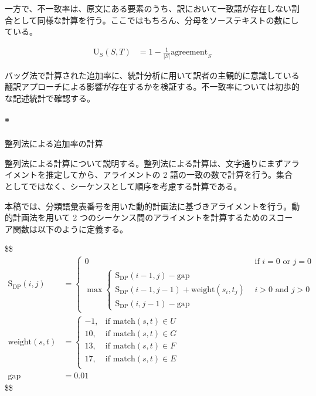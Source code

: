 \documentclass[
  letterpaper,
  DIV=11,
  numbers=noendperiod]{scrartcl}
\let\oldparagraph\paragraph
\renewcommand{\paragraph}[1]{\oldparagraph{#1}\mbox{}}
\begin{document}
一方で、不一致率は、原文にある要素のうち、訳において一致語が存在しない割合として同様な計算を行う。ここではもちろん、分母をソーステキストの数にしている。

\[
\begin{align}
\text{U}_{S}(S,T) &= 1 - \frac{1}{|S|}\text{agreement}_{S}
\end{align}
\]

バッグ法で計算された追加率に、統計分析に用いて訳者の主観的に意識している翻訳アプローチによる影響が存在するかを検証する。不一致率については初歩的な記述統計で確認する。

\paragraph*{整列法による追加率の計算}\label{ux6574ux5217ux6cd5ux306bux3088ux308bux8ffdux52a0ux7387ux306eux8a08ux7b97}

整列法による計算について説明する。整列法による計算は、文字通りにまずアライメントを推定してから、アライメントの
2
語の一致の数で計算を行う。集合としてではなく、シーケンスとして順序を考慮する計算である。

本稿では、分類語彙表番号を用いた動的計画法に基づきアライメントを行う。動的計画法を用いて
2
つのシーケンス間のアライメントを計算するためのスコーア関数は以下のように定義する。

\$\$ \begin{align}
\text{S}_{\text{DP}}(i, j) &=
\begin{cases}
0 & \text{if } i = 0 \text{ or } j = 0 \\
\max
\begin{cases}
\text{S}_{\text{DP}}(i-1, j) - \text{gap} \\
\text{S}_{\text{DP}}(i-1, j-1) + \text{weight}(s_i, t_j) \\
\text{S}_{\text{DP}}(i, j-1) - \text{gap}
\end{cases} & i > 0 \text{ and } j > 0
\end{cases}\\

\text{weight}(s,t) &=
\begin{cases}
-1, & \text{if } \text{match}(s,t) \in U \\
10, & \text{if } \text{match}(s,t) \in G \\
13, & \text{if } \text{match}(s,t) \in F \\
17, & \text{if } \text{match}(s,t) \in E \\
\end{cases}\\

\text{gap} &= 0.01
\end{align} \$\$
\end{document}
